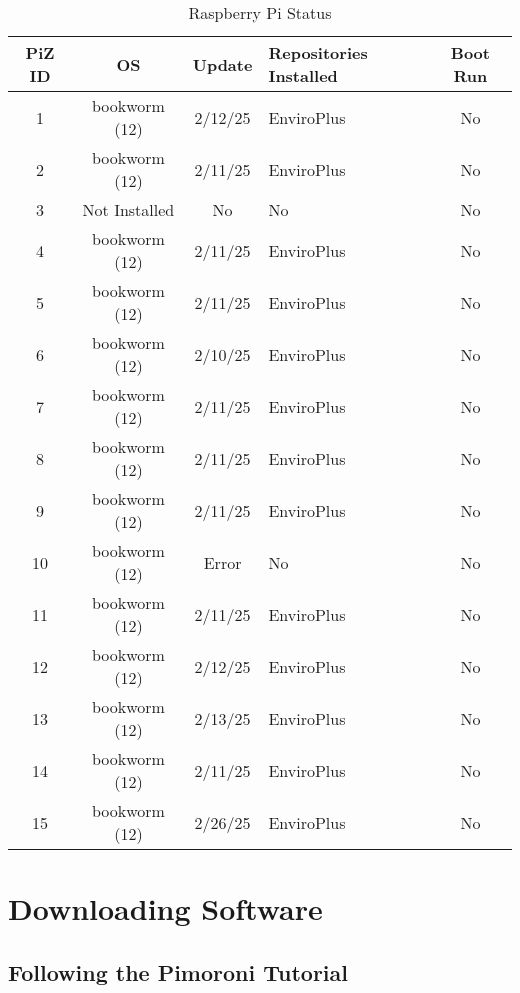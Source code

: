 \documentclass{article}
\begin{document}
\begin{table}[h!]
\begin{center}
\begin{tabular}{|c|c|c|p{2.3cm}|c|}
\hline
\textbf{PiZ ID} & \textbf{OS} & \textbf{Update} & \textbf{Repositories Installed} & \textbf{Boot Run} \\
\hline
1  & bookworm (12)    & 2/12/25 & EnviroPlus & No \\
2  & bookworm (12)    & 2/11/25 & EnviroPlus & No \\
3  & Not Installed    & No & No & No \\
4  & bookworm (12)    & 2/11/25 & EnviroPlus & No \\

5  & bookworm (12)    & 2/11/25 & EnviroPlus & No \\
6  & bookworm (12)    & 2/10/25 & EnviroPlus & No \\
7  & bookworm (12)    & 2/11/25 & EnviroPlus & No \\
8  & bookworm (12)    & 2/11/25 & EnviroPlus & No \\

9  & bookworm (12)    & 2/11/25 & EnviroPlus & No \\
10 & bookworm (12)    & Error & No & No \\
11 & bookworm (12)    & 2/11/25 & EnviroPlus & No \\
12 & bookworm (12)    & 2/12/25 & EnviroPlus & No \\

13 & bookworm (12)    & 2/13/25 & EnviroPlus & No \\
14 & bookworm (12)    & 2/11/25 & EnviroPlus & No \\
15 & bookworm (12)    & 2/26/25  & EnviroPlus & No \\

\hline
\end{tabular}
\end{center}
\caption{Raspberry Pi Status}
\label{table:1}
\end{table}



\section{Downloading Software}

\subsection{Following the Pimoroni Tutorial}
\end{document}
